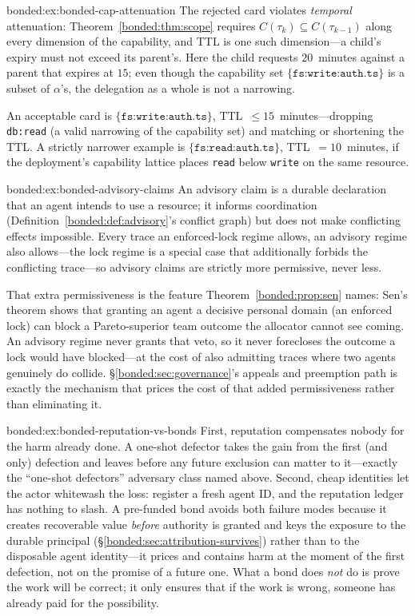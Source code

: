 \begin{pdSolution}{bonded:ex:bonded-cap-attenuation}
The rejected card violates \emph{temporal} attenuation: Theorem~\ref{bonded:thm:scope} requires $C(\tau_{k}) \subseteq C(\tau_{k-1})$ along every dimension of the capability, and TTL is one such dimension---a child's expiry must not exceed its parent's. Here the child requests $20$~minutes against a parent that expires at $15$; even though the capability set $\{\texttt{fs:write:auth.ts}\}$ is a subset of $\alpha$'s, the delegation as a whole is not a narrowing.

An acceptable card is $\{\texttt{fs:write:auth.ts}\}$, TTL~$\le 15$~minutes---dropping \texttt{db:read} (a valid narrowing of the capability set) and matching or shortening the TTL. A strictly narrower example is $\{\texttt{fs:read:auth.ts}\}$, TTL~$=10$~minutes, if the deployment's capability lattice places \texttt{read} below \texttt{write} on the same resource.
\end{pdSolution}
\begin{pdSolution}{bonded:ex:bonded-advisory-claims}
An advisory claim is a durable declaration that an agent intends to use a resource; it informs coordination (Definition~\ref{bonded:def:advisory}'s conflict graph) but does not make conflicting effects impossible. Every trace an enforced-lock regime allows, an advisory regime also allows---the lock regime is a special case that additionally forbids the conflicting trace---so advisory claims are strictly more permissive, never less.

That extra permissiveness is the feature Theorem~\ref{bonded:prop:sen} names: Sen's theorem shows that granting an agent a decisive personal domain (an enforced lock) can block a Pareto-superior team outcome the allocator cannot see coming. An advisory regime never grants that veto, so it never forecloses the outcome a lock would have blocked---at the cost of also admitting traces where two agents genuinely do collide. \S\ref{bonded:sec:governance}'s appeals and preemption path is exactly the mechanism that prices the cost of that added permissiveness rather than eliminating it.
\end{pdSolution}
\begin{pdSolution}{bonded:ex:bonded-reputation-vs-bonds}
First, reputation compensates nobody for the harm already done. A one-shot defector takes the gain from the first (and only) defection and leaves before any future exclusion can matter to it---exactly the ``one-shot defectors'' adversary class named above. Second, cheap identities let the actor whitewash the loss: register a fresh agent ID, and the reputation ledger has nothing to slash. A pre-funded bond avoids both failure modes because it creates recoverable value \emph{before} authority is granted and keys the exposure to the durable principal (\S\ref{bonded:sec:attribution-survives}) rather than to the disposable agent identity---it prices and contains harm at the moment of the first defection, not on the promise of a future one. What a bond does \emph{not} do is prove the work will be correct; it only ensures that if the work is wrong, someone has already paid for the possibility.
\end{pdSolution}
